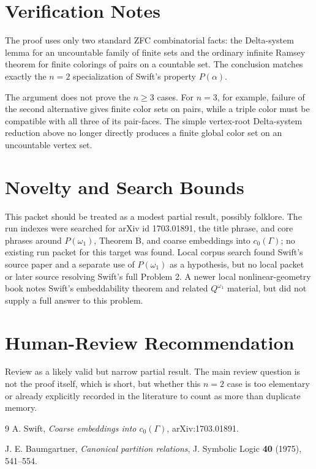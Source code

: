 \documentclass[11pt]{article}
\begin{document}
\section*{Verification Notes}

The proof uses only two standard ZFC combinatorial facts: the Delta-system lemma for an uncountable family of finite sets and the ordinary infinite Ramsey theorem for finite colorings of pairs on a countable set.  The conclusion matches exactly the \(n=2\) specialization of Swift's property \(P(\alpha)\).

The argument does not prove the \(n\ge3\) cases.  For \(n=3\), for example, failure of the second alternative gives finite color sets on pairs, while a triple color must be compatible with all three of its pair-faces.  The simple vertex-root Delta-system reduction above no longer directly produces a finite global color set on an uncountable vertex set.

\section*{Novelty and Search Bounds}

This packet should be treated as a modest partial result, possibly folklore.  The run indexes were searched for arXiv id 1703.01891, the title phrase, and core phrases around \(P(\omega_1)\), Theorem B, and coarse embeddings into \(c_0(\Gamma)\); no existing run packet for this target was found.  Local corpus search found Swift's source paper and a separate use of \(P(\omega_1)\) as a hypothesis, but no local packet or later source resolving Swift's full Problem 2.  A newer local nonlinear-geometry book notes Swift's embeddability theorem and related \(Q^{\omega_1}\) material, but did not supply a full answer to this problem.

\section*{Human-Review Recommendation}

Review as a likely valid but narrow partial result.  The main review question is not the proof itself, which is short, but whether this \(n=2\) case is too elementary or already explicitly recorded in the literature to count as more than duplicate memory.

\begin{thebibliography}{9}
A. Swift, \emph{Coarse embeddings into \(c_0(\Gamma)\)}, arXiv:1703.01891.

J. E. Baumgartner, \emph{Canonical partition relations}, J. Symbolic Logic \textbf{40} (1975), 541--554.
\end{thebibliography}
\end{document}
